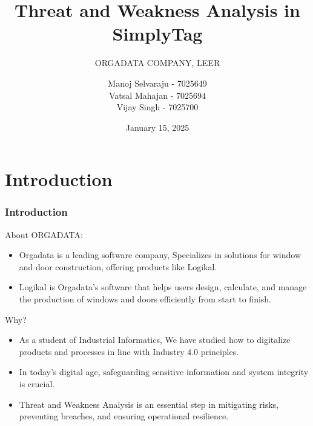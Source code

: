\documentclass[10pt, a4paper]{beamer}
\title{Threat and Weakness Analysis in SimplyTag}
\subtitle{ORGADATA COMPANY, LEER}
\author{
	Manoj Selvaraju - 7025649 \\ 
	Vatsal Mahajan - 7025694\\ 
	Vijay Singh - 7025700
}
\date{January 15, 2025}
\begin{document}
	
	
	
	
	
	\section{Introduction}
	\begin{frame}
		\frametitle{Introduction}
		
		\begin{block}{About ORGADATA:}
			\begin{itemize}
				\item Orgadata is a leading software company, Specializes in solutions for window and door construction, offering products like Logikal.
				\item Logikal is Orgadata's software that helps users design, calculate, and manage the production of windows and doors efficiently from start to finish.
			\end{itemize}
		\end{block}
		
		\begin{block}{Why?}
			\begin{itemize}
				\item As a student of Industrial Informatics, We have studied how to digitalize products and processes in line with Industry 4.0 principles.
				\item In today’s digital age, safeguarding sensitive information and system integrity is crucial.
				\item Threat and Weakness Analysis is an essential step in mitigating risks, preventing breaches, and ensuring operational resilience.	
			\end{itemize}
		\end{block}
		
	\end{frame}
	
	
	
\end{document}
